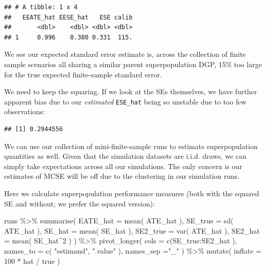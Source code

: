 \documentclass[
]{book}
\newenvironment{Shaded}{\begin{snugshade}}{\end{snugshade}}
\newcommand{\AttributeTok}[1]{\textcolor[rgb]{0.77,0.63,0.00}{#1}}
\newcommand{\DecValTok}[1]{\textcolor[rgb]{0.00,0.00,0.81}{#1}}
\newcommand{\FunctionTok}[1]{\textcolor[rgb]{0.00,0.00,0.00}{#1}}
\newcommand{\NormalTok}[1]{#1}
\newcommand{\SpecialCharTok}[1]{\textcolor[rgb]{0.00,0.00,0.00}{#1}}
\newcommand{\StringTok}[1]{\textcolor[rgb]{0.31,0.60,0.02}{#1}}
\begin{document}
\begin{verbatim}
## # A tibble: 1 x 4
##   EEATE_hat EESE_hat   ESE calib
##       <dbl>    <dbl> <dbl> <dbl>
## 1     0.996    0.380 0.331  115.
\end{verbatim}

We see our expected standard error estimate is, across the collection of finite sample scenarios all sharing a similar parent superpopulation DGP, 15\% too large for the true expected finite-sample standard error.

We need to keep the squaring. If we look at the SEs themselves, we have further apparent bias due to our \emph{estimated} \texttt{ESE\_hat} being so unstable due to too few observations:

\begin{Shaded}
\end{Shaded}

\begin{verbatim}
## [1] 0.2944556
\end{verbatim}

We can use our collection of mini-finite-sample runs to estimate superpopulation quantities as well.
Given that the simulation datasets are i.i.d. draws, we can simply take expectations across all our simulations.
The only concern is our estimates of MCSE will be off due to the clustering in our simulation runs.

Here we calculate superpopulation performance measures (both with the squared SE and without; we prefer the squared version):

\begin{Shaded}
\begin{Highlighting}[]
\NormalTok{runs }\SpecialCharTok{\%\textgreater{}\%}
  \FunctionTok{summarise}\NormalTok{( }\AttributeTok{EATE\_hat =} \FunctionTok{mean}\NormalTok{( ATE\_hat ),}
             \AttributeTok{SE\_true =} \FunctionTok{sd}\NormalTok{( ATE\_hat ),}
             \AttributeTok{SE\_hat =} \FunctionTok{mean}\NormalTok{( SE\_hat ),}
             \AttributeTok{SE2\_true =} \FunctionTok{var}\NormalTok{( ATE\_hat ),}
             \AttributeTok{SE2\_hat =} \FunctionTok{mean}\NormalTok{( SE\_hat}\SpecialCharTok{\^{}}\DecValTok{2}\NormalTok{ ) ) }\SpecialCharTok{\%\textgreater{}\%}
  \FunctionTok{pivot\_longer}\NormalTok{( }\AttributeTok{cols =} \FunctionTok{c}\NormalTok{(SE\_true}\SpecialCharTok{:}\NormalTok{SE2\_hat ),}
                \AttributeTok{names\_to =} \FunctionTok{c}\NormalTok{( }\StringTok{"estimand"}\NormalTok{, }\StringTok{".value"}\NormalTok{ ),}
                \AttributeTok{names\_sep =}\StringTok{"\_"}\NormalTok{ ) }\SpecialCharTok{\%\textgreater{}\%}
  \FunctionTok{mutate}\NormalTok{( }\AttributeTok{inflate =} \DecValTok{100} \SpecialCharTok{*}\NormalTok{ hat }\SpecialCharTok{/}\NormalTok{ true )}
\end{Highlighting}
\end{Shaded}
\end{document}
